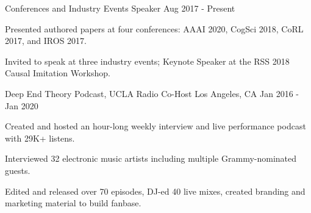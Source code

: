 


\begin{cventries}

\cventry
{Conferences and Industry Events}
{Speaker}
{}
{Aug 2017 - Present}
{
\begin{cvitems}
  \item Presented authored papers at four conferences: AAAI 2020, CogSci 2018, CoRL 2017, and IROS 2017.
  \item Invited to speak at three industry events; Keynote Speaker at the RSS 2018 Causal Imitation Workshop.
\end{cvitems}
}


\cventry
{Deep End Theory Podcast, UCLA Radio}
{Co-Host}
{Los Angeles, CA}
{Jan 2016 - Jan 2020}
{
\begin{cvitems}
  \item Created and hosted an hour-long weekly interview and live performance podcast with 29K+ listens.
  \item Interviewed 32 electronic music artists including multiple Grammy-nominated guests.
  \item Edited and released over 70 episodes, DJ-ed 40 live mixes, created branding and marketing material to build fanbase.
\end{cvitems}
}

\end{cventries}